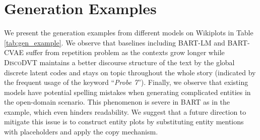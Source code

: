 \documentclass[11pt]{article}
\begin{document}
\section{Generation Examples}\label{sec:gen_example}

We present the generation examples from different models on Wikiplots in Table \ref{tab:gen_example}. We observe that baselines including BART-LM and BART-CVAE suffer from repetition problem as the contexts grow longer while \textsc{DiscoDVT} maintains a better discourse structure of the text by the global discrete latent codes and stays on topic throughout the whole story (indicated by the frequent usage of the keyword ``\textit{Probe 7}''). 
Finally, we observe that existing models have potential spelling mistakes when generating complicated entities in the open-domain scenario. This phenomenon is severe in BART as in the example, which even hinders readability. We suggest that a future direction to mitigate this issue is to construct entity plots by substituting entity mentions with placeholders and apply the copy mechanism.
\end{document}
